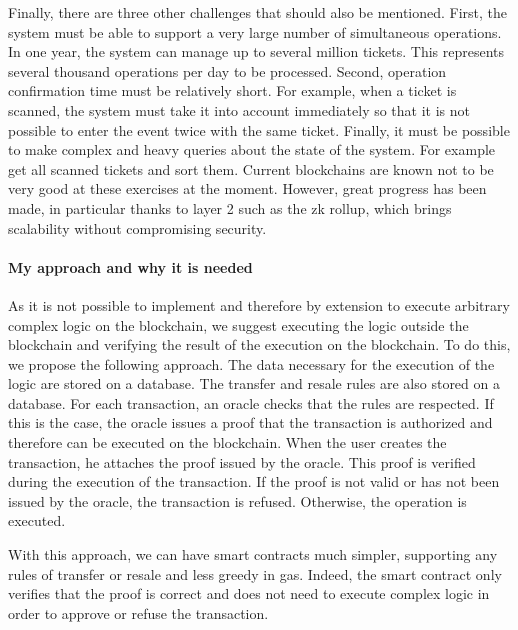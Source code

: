 \documentclass[a4paper,11pt,oneside]{report}
\begin{document}
Finally, there are three other challenges that should also be mentioned. First, the system must be able to support a very large number of simultaneous operations. In one year, the system can manage up to several million tickets. This represents several thousand operations per day to be processed. Second, operation confirmation time must be relatively short. For example, when a ticket is scanned, the system must take it into account immediately so that it is not possible to enter the event twice with the same ticket. Finally, it must be possible to make complex and heavy queries about the state of the system. For example get all scanned tickets and sort them. Current blockchains are known not to be very good at these exercises at the moment. However, great progress has been made, in particular thanks to layer 2 such as the zk rollup, which brings scalability without compromising security.

\paragraph{My approach and why it is needed}  As it is not possible to implement and therefore by extension to execute arbitrary complex logic on the blockchain, we suggest executing the logic outside the blockchain and verifying the result of the execution on the blockchain. To do this, we propose the following approach. The data necessary for the execution of the logic are stored on a database. The transfer and resale rules are also stored on a database. For each transaction, an oracle checks that the rules are respected. If this is the case, the oracle issues a proof that the transaction is authorized and therefore can be executed on the blockchain. When the user creates the transaction, he attaches the proof issued by the oracle. This proof is verified during the execution of the transaction. If the proof is not valid or has not been issued by the oracle, the transaction is refused. Otherwise, the operation is executed.

With this approach, we can have smart contracts much simpler, supporting any rules of transfer or resale and less greedy in gas. Indeed, the smart contract only verifies that the proof is correct and does not need to execute complex logic in order to approve or refuse the transaction.
\end{document}
